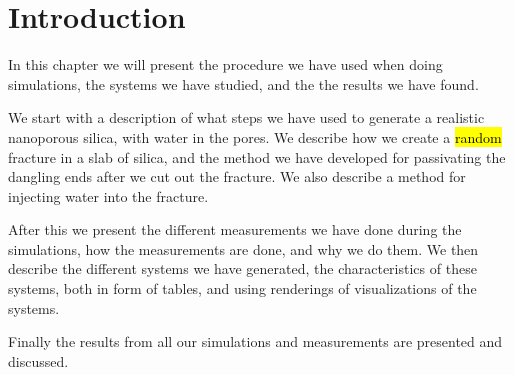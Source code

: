 \chapter*{Introduction}%
%
In this chapter we will present the procedure we have used when doing simulations, the systems we have studied, and the the results we have found. 

We start with a description of what steps we have used to generate a realistic nanoporous silica, with water in the pores. We describe how we create a \hl{random} fracture in a slab of silica, and the method we have developed for passivating the dangling ends after we cut out the fracture. We also describe a method for injecting water into the fracture.

After this we present the different measurements we have done during the simulations, how the measurements are done, and why we do them. We then describe the different systems we have generated, the characteristics of these systems, both in form of tables, and using renderings of visualizations of the systems.

Finally the results from all our simulations and measurements are presented and discussed. 